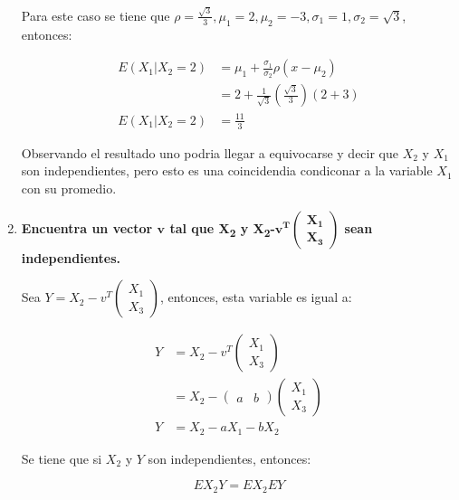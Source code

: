 \begin{enumerate}
          Para este caso se tiene que $\rho = \frac{\sqrt{3}}{3}, \mu_1=2, \mu_2 = -3,\sigma_1=1 ,\sigma_2 = \sqrt{3}$, entonces:

          \begin{align*}
              E(X_1 | X_2=2) & = \mu_1 + \frac{\sigma_1}{\sigma_2} \rho (x-\mu_2)            \\
                             & = 2 +\frac{1}{\sqrt{3}}\left (\frac{\sqrt{3}}{3}\right )(2+3) \\
              E(X_1 | X_2=2) & = \frac{11}{3}
          \end{align*}

          Observando el resultado uno podria llegar a equivocarse y decir que $X_2$ y $X_1$ son independientes, pero esto es una coincidendia condiconar a la variable $X_1$ con su promedio.

    \item \textbf{Encuentra un vector $\mathbf{v}$ tal que X\textsubscript{2} y X\textsubscript{2}-$\mathbf{v^T \begin{pmatrix} X_1 \\ X_3 \end{pmatrix}}$ sean independientes.}

          Sea $Y=X_2 - v^T \begin{pmatrix}
                  X_1 \\ X_3
              \end{pmatrix}$, entonces, esta variable es igual a:

          \begin{align*}
              Y & = X_2 - v^T \begin{pmatrix}
                  X_1 \\ X_3
              \end{pmatrix}                        \\
                & = X_2 - \begin{pmatrix}
                  a & b
              \end{pmatrix} \begin{pmatrix}
                  X_1 \\ X_3
              \end{pmatrix} \\
              Y & = X_2 -aX_1 -b X_2
          \end{align*}

          Se tiene que si $X_2$ y $Y$ son independientes, entonces:

          \begin{equation*}
              EX_2Y = EX_2 EY
          \end{equation*}


\end{enumerate}
